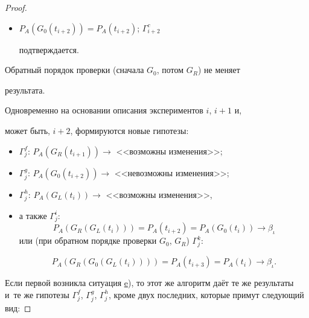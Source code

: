 \begin{proof}
\begin{itemize}
$P_{A}(G_{R}(t_{i+1})) = P_{A}(t_{i+2}) \ne P_{A}(t_{i})$;

$\Gamma^{e}_{i+1}$: $P_{A}(G_{R}(t_{i})) \ne  P_{A}(t_{i})$;

$\Gamma ^{b}_{j}$ и $\Gamma^{e}_{i+1}$ отбрасываются;



\item[\hyperlink{kr:g1}{g})]

$P_{A}(G_{0}(t_{i+2}))= P_{A}(t_{i+2})$; $\Gamma ^{c}_{i+2 }$

подтверждается.



\end{itemize}



Обратный порядок проверки (сначала $G_{0}$, потом $G_{R}$) не меняет

результата. 

Одновременно на основании описания экспериментов $i$, $i+1$ и,

может быть, $i+2$, формируются новые гипотезы: 

\begin{itemize}

\item[--] $\Gamma^{f}_{j}$: $P_{A}(G_{R}(t_{i+1}))\to$ <<возможны изменения>>; 

\item[--] $\Gamma^{g}_{j}$: $P_{A}(G_{0}(t_{i+2}))\to $ <<невозможны изменения>>; 

\item[--] $\Gamma^{h}_{j}$: $P_{A}(G_{L}(t_{i}))\to$ <<возможны изменения>>, 

\item[] а также $\Gamma^{i}_{j}$: $$P_{A}(G_{R}(G_{L}(t_{i})))=P_{A}(t_{i+2}) =

P_{A}(G_{0}(t_{i}))\to  \beta_{\iota }$$ или (при обратном порядке проверки $G_{0}$, $G_{R}$) $\Gamma^{k}_{j}$:

$$P_{A}(G_{R}(G_{0}(G_{L}(t_{i}))))=P_{A}(t_{i+3})=P_{A}(t_{i})\to \beta_{\iota }.$$



\end{itemize}



Если первой возникла ситуация \hyperlink{kr:e1}{e}), то этот же алгоритм даёт те же результаты и~те же гипотезы $\Gamma^{f}_{j}$, $\Gamma ^{g}_{j}$, $\Gamma^{h}_{j}$, кроме двух последних, которые примут следующий вид:


\end{proof}
